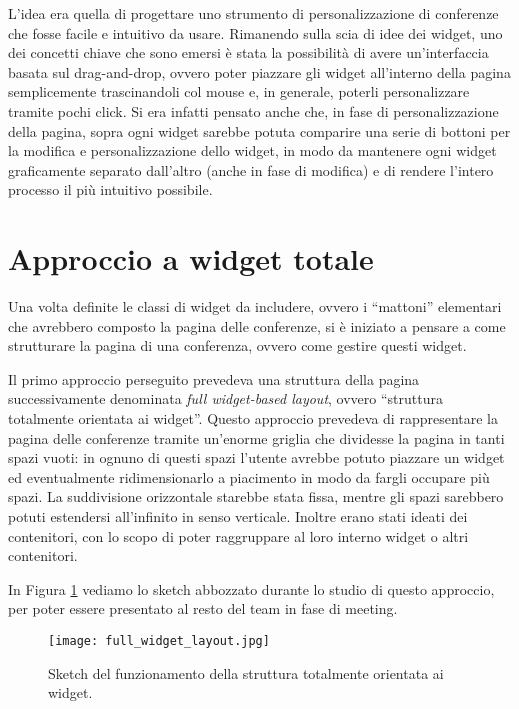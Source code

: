        L'idea era quella di progettare uno strumento di personalizzazione di conferenze che fosse facile e intuitivo da usare. Rimanendo sulla scia di idee dei widget, uno dei concetti chiave che sono emersi è stata la possibilità di avere un'interfaccia basata sul drag-and-drop, ovvero poter piazzare gli widget all'interno della pagina semplicemente trascinandoli col mouse e, in generale, poterli personalizzare tramite pochi click. Si era infatti pensato anche che, in fase di personalizzazione della pagina, sopra ogni widget sarebbe potuta comparire una serie di bottoni per la modifica e personalizzazione dello widget, in modo da mantenere ogni widget graficamente separato dall'altro (anche in fase di modifica) e di rendere l'intero processo il più intuitivo possibile.
       	
    \section{Approccio a widget totale} \label{sec:ccp;approccio_widget_totale}
    
        Una volta definite le classi di widget da includere, ovvero i ``mattoni'' elementari che avrebbero composto la pagina delle conferenze, si è iniziato a pensare a come strutturare la pagina di una conferenza, ovvero come gestire questi widget.
        
        Il primo approccio perseguito prevedeva una struttura della pagina successivamente denominata \textit{full widget-based layout}, ovvero ``struttura totalmente orientata ai widget''. Questo approccio prevedeva di rappresentare la pagina delle conferenze tramite un'enorme griglia che dividesse la pagina in tanti spazi vuoti: in ognuno di questi spazi l'utente avrebbe potuto piazzare un widget ed eventualmente ridimensionarlo a piacimento in modo da fargli occupare più spazi. La suddivisione orizzontale starebbe stata fissa, mentre gli spazi sarebbero potuti estendersi all'infinito in senso verticale. Inoltre erano stati ideati dei contenitori, con lo scopo di poter raggruppare al loro interno widget o altri contenitori.
        
        In Figura \ref{fig:full_widget_layout} vediamo lo sketch abbozzato durante lo studio di questo approccio, per poter essere presentato al resto del team in fase di meeting.
        
       	\begin{figure}[h!]
       		\begin{center}
       			\texttt{[image: full\_widget\_layout.jpg]}
       		\end{center}
       		\caption[Sketch della struttura a widget totale]{Sketch del funzionamento della struttura totalmente orientata ai widget.}
       		\label{fig:full_widget_layout}
       	\end{figure}
       	
